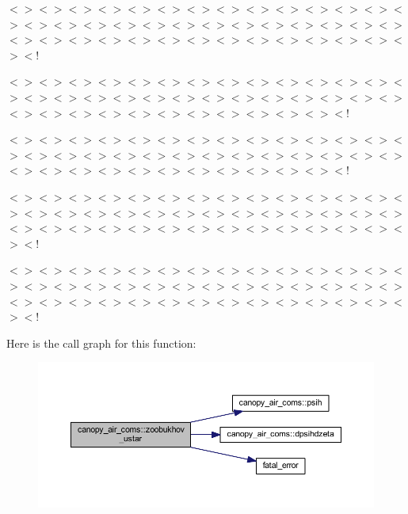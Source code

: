 $<$$>$$<$$>$$<$$>$$<$$>$$<$$>$$<$$>$$<$$>$$<$$>$$<$$>$$<$$>$$<$$>$$<$$>$$<$$>$$<$$>$$<$$>$$<$$>$$<$$>$$<$$>$$<$$>$$<$$>$$<$$>$$<$$>$$<$$>$$<$$>$$<$$>$$<$$>$$<$$>$$<$$>$$<$$>$$<$$>$$<$$>$$<$$>$$<$$>$$<$$>$$<$$>$$<$$>$$<$$>$$<$$>$$<$$>$$<$$>$$<$$>$$<$!

$<$$>$$<$$>$$<$$>$$<$$>$$<$$>$$<$$>$$<$$>$$<$$>$$<$$>$$<$$>$$<$$>$$<$$>$$<$$>$$<$$>$$<$$>$$<$$>$$<$$>$$<$$>$$<$$>$$<$$>$$<$$>$$<$$>$$<$$>$$<$$>$$<$$>$$<$$>$$<$$>$$<$$>$$<$$>$$<$$>$$<$$>$$<$$>$$<$$>$$<$$>$$<$$>$$<$$>$$<$$>$$<$$>$$<$!

$<$$>$$<$$>$$<$$>$$<$$>$$<$$>$$<$$>$$<$$>$$<$$>$$<$$>$$<$$>$$<$$>$$<$$>$$<$$>$$<$$>$$<$$>$$<$$>$$<$$>$$<$$>$$<$$>$$<$$>$$<$$>$$<$$>$$<$$>$$<$$>$$<$$>$$<$$>$$<$$>$$<$$>$$<$$>$$<$$>$$<$$>$$<$$>$$<$$>$$<$$>$$<$$>$$<$$>$$<$$>$$<$$>$$<$!

$<$$>$$<$$>$$<$$>$$<$$>$$<$$>$$<$$>$$<$$>$$<$$>$$<$$>$$<$$>$$<$$>$$<$$>$$<$$>$$<$$>$$<$$>$$<$$>$$<$$>$$<$$>$$<$$>$$<$$>$$<$$>$$<$$>$$<$$>$$<$$>$$<$$>$$<$$>$$<$$>$$<$$>$$<$$>$$<$$>$$<$$>$$<$$>$$<$$>$$<$$>$$<$$>$$<$$>$$<$$>$$<$$>$$<$$>$$<$$>$$<$$>$$<$!

$<$$>$$<$$>$$<$$>$$<$$>$$<$$>$$<$$>$$<$$>$$<$$>$$<$$>$$<$$>$$<$$>$$<$$>$$<$$>$$<$$>$$<$$>$$<$$>$$<$$>$$<$$>$$<$$>$$<$$>$$<$$>$$<$$>$$<$$>$$<$$>$$<$$>$$<$$>$$<$$>$$<$$>$$<$$>$$<$$>$$<$$>$$<$$>$$<$$>$$<$$>$$<$$>$$<$$>$$<$$>$$<$$>$$<$$>$$<$$>$$<$$>$$<$! 

Here is the call graph for this function\+:\nopagebreak
\begin{figure}[H]
\begin{center}
\leavevmode
\includegraphics[width=350pt]{namespacecanopy__air__coms_a5251266695c581c8f4058d98f6c86200_cgraph}
\end{center}
\end{figure}


